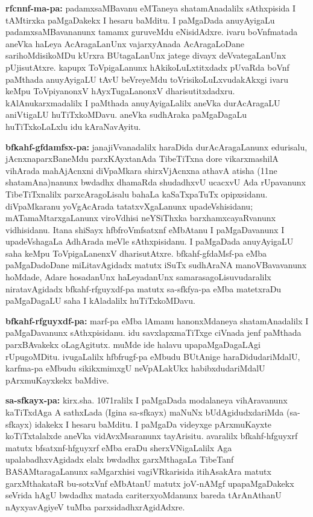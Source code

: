 {\bf rfcnnf-ma-pa:} padamxsaMBavanu eMTaneya shatamAnadalilx sAthxpisida I tAMtirxka paMgaDakekx I hesaru baMditu. I paMgaDada anuyAyigaLu padamxsaMBavananunx tamamx guruveMdu eNisidAdxre. ivaru boVnfmatada aneVka haLeya AcAragaLanUnx vajarxyAnada AcAragaLoDane sarihoMdisikoMDu kUrxra BUtagaLanUnx jatege divayx deVvategaLanUnx pUjisutAtxre. kapupx ToVpigaLanunx hAkikoLuLxtitxdadx pUvaRda boVnf paMthada anuyAyigaLU tAvU beVreyeMdu toVrisikoLuLxvudakAkxgi ivaru keMpu ToVpiyanonxV hAyxTugaLanonxV dharisutitxdadxru. kAlAnukarxmadalilx I paMthada anuyAyigaLalilx aneVka durAcAragaLU aniVtigaLU huTiTxkoMDavu. aneVka sudhAraka paMgaDagaLu huTiTxkoLaLxlu idu kAraNavAyitu.

{\bf bfkahf-gfdamfsx-pa:} janajiVvanadalilx haraDida durAcAragaLanunx edurisalu, jAcnxnaparxBaneMdu parxKAyxtanAda TibeTiTxna dore vikarxmashilA vihArada mahAjAcnxni diVpaMkara shirxVjAcnxna athavA atisha (11ne shatamAna)nanunx bwdadhx dhamaRda \hbox{shudadhxvU} ucacxvU Ada rUpavanunx TibeTiTxnalilx parxcAragoLisalu bahaLa kaSaTxpaTuTx opipxsidanu. diVpaMkaranu yoVgAcArada tatatxvXgaLanunx upadeVshisidanu; mATamaMtarxgaLanunx viroV\-dhisi neYSiThxka barxhamxcayaRvanunx vidhisidanu. Itana shiSayx hfbfroVmfsatxnf eMbA\-tanu I paMgaDavanunx I upadeVshagaLa AdhArada meVle sAthxpisidanu. I paMgaDada anuyAyigaLU saha keMpu ToVpigaLanenxV dharisutAtxre. bfkahf-gfdaMsf-pa eMba paMgaDadoDane miLitavAgidadx matutx iSuTx sudhAraNA manoVBavavanunx hoMdade, Adare hosadanUnx haLeyadanUnx samarasagoLisuvudaralilx niratavAgidadx bfkahf-rfguyxdf-pa matutx sa-sfkfya-pa eMba matetxraDu paMgaDagaLU saha I kAladalilx huTiTxkoMDavu.

{\bf bfkahf-rfguyxdf-pa:} marf-pa eMba lAmanu hanonxMdaneya shatamAnadalilx I paMgaDavanunx sAthxpisidanu. idu savxlapxmaTiTxge ciVnada jenf paMthada parxBAvakekx oLagAgitutx. muMde ide halavu upapaMgaDagaLAgi rUpugoMDitu. ivugaLalilx hfbfrugf-pa eMbudu BUtAnige haraDidudariMdalU, karfma-pa eMbudu sikikxmimxgU neVpALakUkx habibxdudariMdalU pArxmuKayxkekx baMdive.

{\bf sa-sfkayx-pa:} kirx.sha. 1071ralilx I paMgaDada modalaneya vihAravanunx kaTiTxdAga A sathxLada (Igina sa-sfkayx) maNuNx bUdAgidudxdariMda (sa-sfkayx) idakekx I hesaru baMditu. I paMgaDa videyxge pArxmuKayxte koTiTxtalalxde aneVka vidAvxMsaranunx tayArisitu. avaralilx bfkahf-hfguyxrf matutx bfsatxnf-hfguyxrf eMba eraDu sherxVNigaLalilx Aga upalabadhxvAgidadx elalx bwdadhx garxMthagaLa TibeTanf BASAMtaragaLanunx saMgarxhisi vagiVRkarisida itihAsakAra matutx garxMthakataR bu-sotxVnf eMbAtanU matutx joV-nAMgf upapaMgaDakekx seVrida hAgU bwdadhx matada cariterxyoMdanunx bareda tArAnAthanU nAyxyavAgiyeV tuMba parxsidadhxrAgidAdxre.

